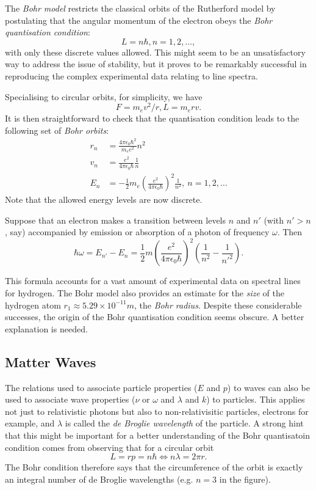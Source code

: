 \documentclass[a4paper]{article}
\begin{document}
The \emph{Bohr model} restricts the classical orbits of the Rutherford model by postulating that the angular momentum of the electron obeys the \emph{Bohr quantisation condition}:
\[
  L = n\hbar, n=1,2,\ldots,
\]
with only these discrete values allowed. This might seem to be an unsatisfactory way to address the issue of stability, but it proves to be remarkably successful in reproducing the complex experimental data relating to line spectra.

Specialising to circular orbits, for simplicity, we have
\[
  F=m_e v^2/r, L=m_e rv.
\]
It is then straightforward to check that the quantisation condition leads to the following set of \emph{Bohr orbits}:
\begin{align*}
  r_n &= \frac{4\pi\epsilon_0\hbar^2}{m_e e^2}n^2 \\
  v_n &= \frac{e^2}{4\pi\epsilon_0\hbar}\frac{1}{n} \\
  E_n &= -\frac{1}{2}m_e (\frac{e^2}{4\pi\epsilon_0\hbar})^2\frac{1}{n^2},\: n =1,2,\ldots
\end{align*}
Note that the allowed energy levels are now discrete.

Suppose that an electron makes a transition between levels $n$ and $n'$ (with $n' > n$, say) accompanied by emission or absorption of a photon of frequency $\omega$. Then
\[
  \hbar\omega = E_{n'} - E_n = \frac{1}{2}m(\frac{e^2}{4\pi\epsilon_0\hbar})^2 (\frac{1}{n^2} - \frac{1}{n'^2}).
\]

This formula accounts for a vast amount of experimental data on spectral lines for hydrogen. The Bohr model also provides an estimate for the \emph{size} of the hydrogen atom $r_1 \approx 5.29\times 10^{-11} m$, the \emph{Bohr radius}. Despite these considerable successes, the origin of the Bohr quantisation condition seems obscure. A better explanation is needed.

\subsection{Matter Waves}

The relations used to associate particle properties ($E$ and $p$) to waves can also be used to associate wave properties ($\nu$ or $\omega$ and $\lambda$ and $k$) to particles. This applies not just to relativistic photons but also to non-relativisitic particles, electrons for example, and $\lambda$ is called the \emph{de Broglie wavelength} of the particle. A strong hint that this might be important for a better understanding of the Bohr quantisatoin condition comes from observing that for a circular orbit
\[
  L = rp = n\hbar \Leftrightarrow n\lambda = 2\pi r.
\]
The Bohr condition therefore says that the circumference of the orbit is exactly an integral number of de Broglie wavelengths (e.g. $n=3$ in the figure).
\end{document}
